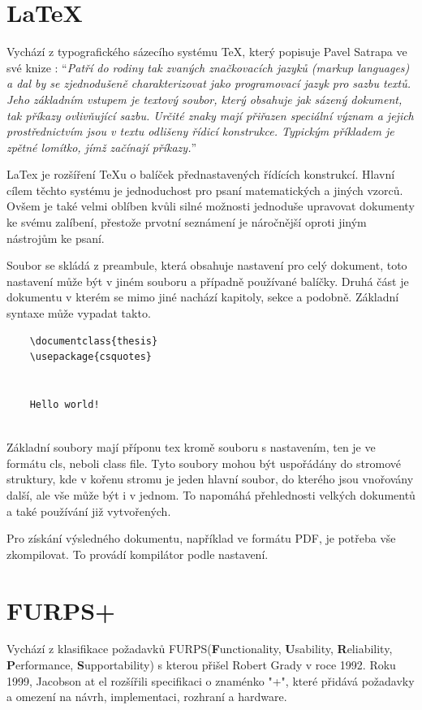 \section{LaTeX} 
	Vychází z typografického sázecího systému TeX, který popisuje Pavel Satrapa ve své knize \cite{latex}: \enquote{\textit{Patří do rodiny tak zvaných značkovacích jazyků (markup languages) a dal by se zjednodušeně charakterizovat jako programovací jazyk pro sazbu textů. Jeho základním vstupem je textový soubor, který obsahuje jak sázený dokument, tak příkazy ovlivňující sazbu. Určité znaky mají přiřazen speciální význam a jejich prostřednictvím jsou v textu odlišeny řídicí konstrukce. Typickým příkladem je zpětné lomítko, jímž začínají příkazy.}}
	
	LaTex je rozšíření TeXu o balíček přednastavených řídících konstrukcí. Hlavní cílem těchto systému je jednoduchost pro psaní matematických a jiných vzorců. Ovšem je také velmi oblíben kvůli silné možnosti jednoduše upravovat dokumenty ke svému zalíbení, přestože prvotní seznámení je náročnější oproti jiným nástrojům ke psaní.
	
	Soubor se skládá z preambule, která obsahuje nastavení pro celý dokument, toto nastavení může být v jiném souboru a případně používané balíčky. Druhá část je dokumentu v kterém se mimo jiné nachází kapitoly, sekce a podobně. Základní syntaxe může vypadat takto.
	\begin{verbatim}
	\documentclass{thesis}
	\usepackage{csquotes}
	
	
	Hello world!
	
	\end{verbatim}
	
	Základní soubory mají příponu tex kromě souboru s nastavením, ten je ve formátu cls, neboli class file. Tyto soubory mohou být uspořádány do stromové struktury, kde v kořenu stromu je jeden hlavní soubor, do kterého jsou vnořovány další, ale vše může být i v jednom. To napomáhá přehlednosti velkých dokumentů a také používání již vytvořených. 
	
	Pro získání výsledného dokumentu, například ve formátu PDF, je potřeba vše zkompilovat. To provádí kompilátor podle nastavení.  

\section{FURPS+}
	Vychází z klasifikace požadavků FURPS(\textbf{F}unctionality, \textbf{U}sability, \textbf{R}eliability, \textbf{P}erformance, \textbf{S}upportability) s kterou přišel Robert Grady v roce 1992. Roku 1999, Jacobson at el rozšířili specifikaci o znaménko "+", které přidává požadavky a omezení na návrh, implementaci, rozhraní a hardware. 
	

